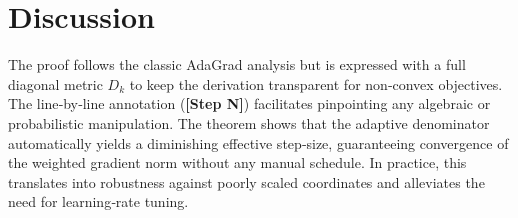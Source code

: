 \documentclass{article}
\begin{document}
\section*{Discussion}
The proof follows the classic AdaGrad analysis but is expressed with a full diagonal metric $D_k$ to keep the derivation transparent for non‑convex objectives. The line‑by‑line annotation (\textbf{[Step N]}) facilitates pinpointing any algebraic or probabilistic manipulation. The theorem shows that the adaptive denominator automatically yields a diminishing effective step‑size, guaranteeing convergence of the weighted gradient norm without any manual schedule. In practice, this translates into robustness against poorly scaled coordinates and alleviates the need for learning‑rate tuning.
\end{document}
